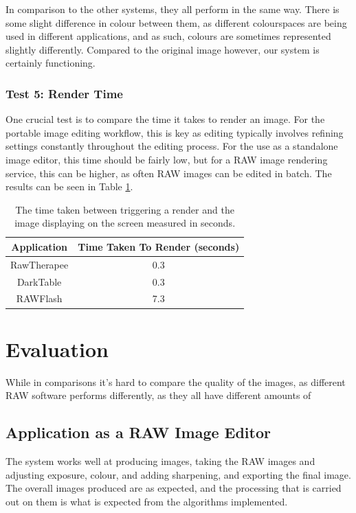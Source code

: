 \documentclass[11pt,a4paper]{article}
\begin{document}
In comparison to the other systems, they all perform in the same way. There is some slight difference in colour between them, as different colourspaces
are being used in different applications, and as such, colours are sometimes represented slightly differently. Compared to the original image however, our
system is certainly functioning.

\subsubsection{Test 5: Render Time}
One crucial test is to compare the time it takes to render an image. For the portable image editing workflow, this is key as editing typically involves
refining settings constantly throughout the editing process. For the use as a standalone image editor, this time should be fairly low, but for a RAW
image rendering service, this can be higher, as often RAW images can be edited in batch. The results can be seen in Table \ref{RenderTimeTable}.

\begin{table}
    \centering
    \begin{tabular}{| c | c |}
        \hline
        Application & Time Taken To Render (seconds)\\
        \hline
        RawTherapee & 0.3\\
        DarkTable & 0.3 \\
        RAWFlash & 7.3 \\
        \hline
    \end{tabular}
    \caption{The time taken between triggering a render and the image displaying on the screen measured in seconds.}
    \label{RenderTimeTable}
\end{table}

\section{Evaluation}
While in comparisons it's hard to compare the quality of the images, as different RAW software performs differently, as they all have different amounts
of 

\subsection{Application as a RAW Image Editor}
The system works well at producing images, taking the RAW images and adjusting exposure, colour, and adding sharpening, and exporting the final image.
The overall images produced are as expected, and the processing that is carried out on them is what is expected from the algorithms implemented.
\end{document}
